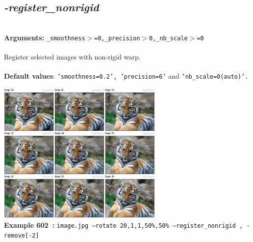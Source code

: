 \documentclass[a4paper,11pt,twoside]{book}
\begin{document}
\subsection{\emph{-register\_nonrigid} }\vspace*{-0.5em}
~\\\textbf{Arguments: } 
{\small \texttt{\_smoothness$>$=0,\_precision$>$0,\_nb\_scale$>$=0}}\\~\\
Register selected images with non-rigid warp.
~\\~\\\textbf{Default values}: {\small \texttt{'smoothness=0.2', 'precision=6'} and \texttt{'nb\_scale=0(auto)'.}}
\begin{center}\includegraphics[keepaspectratio=true,height=7cm,width=\textwidth]{img/gmic_def602.jpg}\\
{\footnotesize \textbf{Example 602~:} \texttt{image.jpg --rotate 20,1,1,50\%,50\% --register\_nonrigid , -remove[-2]}}
\end{center}
\end{document}
